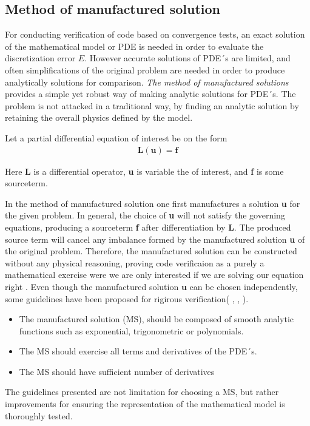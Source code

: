 \subsection{Method of manufactured solution}

For conducting verification of code based on convergence tests, an exact solution of the mathematical model or PDE is needed in order to evaluate the discretization error $E$. However accurate solutions of PDE´s are limited, and often simplifications of the original problem are needed in order to produce analytically solutions for comparison. 
\textit{The method of manufactured solutions} provides a simple yet robust way of making analytic solutions for PDE´s. The problem is not attacked in a traditional way, by finding an analytic solution by retaining the overall physics defined by the model. 

Let a  partial differential equation of interest be on the form
\begin{align*}
\textbf{L}(\textbf{u}) = \textbf{f}
\end{align*}

Here \textbf{L} is a differential operator, \textbf{u} is variable the of interest, and \textbf{f} is some sourceterm.

In the method of manufactured solution one first manufactures a solution \textbf{u} for the given problem. In general, the choice of \textbf{u} will not satisfy the governing equations, producing a sourceterm  \textbf{f} after differentiation by \textbf{L}. The produced source term will cancel any imbalance formed by the manufactured solution \textbf{u} of the original problem. Therefore, the manufactured solution can be constructed without any physical reasoning, proving code verificaion as a purely a mathematical exercise were we are only interested if we are solving our equation right \cite{Roache2002}. Even though the manufactured solution \textbf{u} can be chosen independently, some guidelines have been proposed for rigirous verification( \cite{Etienne2006}, \cite{Biggs}, \cite{Roache2002}). 

\begin{itemize}
\item The manufactured solution (MS), should be composed of smooth analytic functions such as exponential, trigonometric or polynomials.
\item The MS should exercise all terms and derivatives of the PDE´s. 
\item The MS should have sufficient number of derivatives
\end{itemize}
The guidelines presented are not limitation for choosing a MS, but rather improvements for ensuring the representation of the mathematical model is thoroughly tested. 

